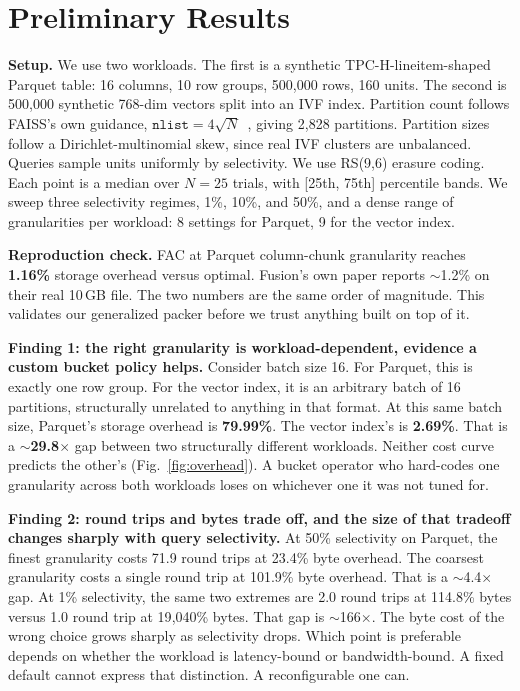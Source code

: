 \documentclass[10pt,conference]{IEEEtran}
\begin{document}
\section{Preliminary Results}

\textbf{Setup.} We use two workloads. The first is a synthetic
TPC-H-lineitem-shaped Parquet table: 16 columns, 10 row groups, 500{,}000
rows, 160 units. The second is 500{,}000 synthetic 768-dim vectors split
into an IVF index. Partition count follows FAISS's own guidance,
$\texttt{nlist}=4\sqrt{N}$~\cite{faiss2024}, giving 2{,}828 partitions.
Partition sizes follow a Dirichlet-multinomial skew, since real IVF
clusters are unbalanced. Queries sample units uniformly by selectivity. We
use RS(9,6) erasure coding. Each point is a median over $N{=}25$ trials,
with [25th, 75th] percentile bands. We sweep three selectivity regimes,
1\%, 10\%, and 50\%, and a dense range of granularities per workload: 8
settings for Parquet, 9 for the vector index.

\textbf{Reproduction check.} FAC at Parquet column-chunk granularity reaches
\textbf{1.16\%} storage overhead versus optimal. Fusion's own paper
reports $\sim$1.2\% on their real 10\,GB file. The two numbers are the
same order of magnitude. This validates our generalized packer before we
trust anything built on top of it.

\textbf{Finding 1: the right granularity is workload-dependent, evidence a
custom bucket policy helps.} Consider batch size 16. For Parquet, this is
exactly one row group. For the vector index, it is an arbitrary batch of 16
partitions, structurally unrelated to anything in that format. At this
same batch size, Parquet's storage overhead is \textbf{79.99\%}. The vector
index's is \textbf{2.69\%}. That is a $\sim$\textbf{29.8}$\times$ gap
between two structurally different workloads. Neither cost curve predicts
the other's (Fig.~\ref{fig:overhead}). A bucket operator who hard-codes one
granularity across both workloads loses on whichever one it was not tuned
for.

\textbf{Finding 2: round trips and bytes trade off, and the size of that
tradeoff changes sharply with query selectivity.} At 50\% selectivity on
Parquet, the finest granularity costs 71.9 round trips at 23.4\% byte
overhead. The coarsest granularity costs a single round trip at 101.9\%
byte overhead. That is a $\sim$4.4$\times$ gap. At 1\% selectivity, the
same two extremes are 2.0 round trips at 114.8\% bytes versus 1.0 round
trip at 19{,}040\% bytes. That gap is $\sim$166$\times$. The byte cost of
the wrong choice grows sharply as selectivity drops. Which point is
preferable depends on whether the workload is latency-bound or
bandwidth-bound. A fixed default cannot express that distinction. A
reconfigurable one can.
\end{document}

